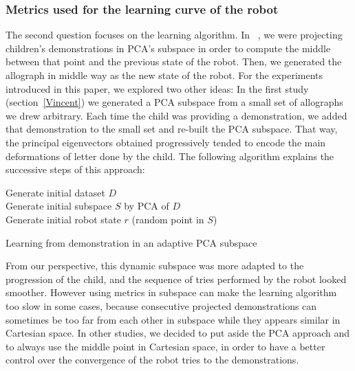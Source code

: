 \documentclass[conference]{IEEEtran}
\begin{document}
\subsubsection{Metrics used for the learning curve of the robot}
The second question focuses on the learning algorithm. In
~\cite{Hood}, we were projecting children's demonstrations in PCA's subspace in order to 
compute the middle between that point and the previous state of the robot. Then, we
generated the allograph in middle way as the new state of
the robot. For the experiments introduced in this paper, we explored two other
ideas: In the first study (section~\ref{Vincent}) we generated a PCA subspace from a
small set of allographs we drew arbitrary. Each time the child was providing a
demonstration, we added that demonstration to the small set and re-built the
PCA subspace. That way, the principal eigenvectors obtained progressively
tended to encode the main deformations of letter done by the child. The following algorithm explains the successive steps of this approach:

\begin{algorithm}
   Generate initial dataset $D$ \\
   Generate initial subspace $S$ by PCA of $D$ \\
   Generate initial robot state $r$ (random point in $S$) \\
   \caption{Learning from demonstration in an adaptive PCA subspace}
\end{algorithm}

From our perspective, this dynamic subspace was more adapted to the 
progression of the child, and the sequence of tries performed by the robot looked smoother.
However using metrics in subspace can make the learning algorithm too slow in some
cases, because consecutive projected demonstrations can sometimes be too
far from each other in subspace while they appears similar in Cartesian space.
In other studies, we decided to put aside the PCA approach and to always use the middle point in Cartesian space, in order to
have a better control over the convergence of the robot tries to the demonstrations.
\end{document}
